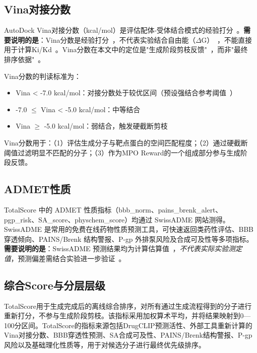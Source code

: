 \subsection{Vina对接分数}\label{sec:vina-metric}

AutoDock Vina对接分数（kcal/mol）是评估配体-受体结合模式的经验打分~\cite{Trott2010}。\textbf{需要说明的是}：Vina分数是经验打分~\cite{Trott2010}，不代表实验结合自由能（$\Delta$G）~\cite{Trott2010}，不能直接用于计算Ki/Kd~\cite{Trott2010}。Vina分数在本文中的定位是"生成阶段剪枝反馈"~\cite{Trott2010}，而非"最终排序依据"~\cite{Gao2023}。

Vina分数的判读标准为：
\begin{itemize}
    \item Vina < -7.0 kcal/mol：对接分数处于较优区间（预设强结合参考阈值~\cite{Trott2010}）
    \item -7.0 $\le$ Vina < -5.0 kcal/mol：中等结合
    \item Vina $\ge$ -5.0 kcal/mol：弱结合，触发硬截断剪枝
\end{itemize}

Vina分数用于：（1）评估生成分子与靶点蛋白的空间匹配程度；（2）通过硬截断阈值过滤明显不匹配的分子；（3）作为MPO Reward的一个组成部分参与生成阶段反馈。

\subsection{ADMET性质}\label{sec:bbb-metric}

TotalScore 中的 ADMET 性质指标（bbb\_norm、pains\_brenk\_alert、pgp\_risk、SA\_score、physchem\_score）均通过 SwissADME 网站测得。SwissADME 是常用的免费在线药物性质预测工具，可快速返回类药性评估、BBB 穿透倾向、PAINS/Brenk 结构警报、P-gp 外排泵风险及合成可及性等多项指标。\textbf{需要说明的是}：SwissADME 预测结果均为计算估算值~\cite{Daina2017}，\textit{不代表实际实验测定值}，预测偏差需结合实验进一步验证~\cite{Daina2017}。

\subsection{综合Score与分层层级}\label{sec:total-score}

TotalScore用于生成完成后的离线综合排序，对所有通过生成流程得到的分子进行重新打分，不参与生成阶段剪枝。该指标采用加权算术平均，并将结果映射到0—100分区间。TotalScore的指标来源包括DrugCLIP预测活性、外部工具重新计算的Vina对接分数、BBB穿透性预测、SA合成可及性、PAINS/Brenk结构警报、P-gp风险以及基础理化性质等，用于对候选分子进行最终优先级排序。

